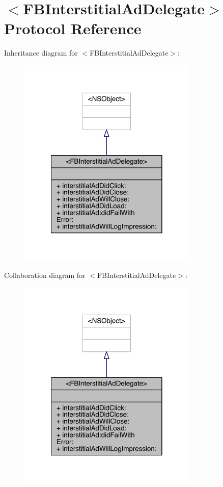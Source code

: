 \hypertarget{protocol_f_b_interstitial_ad_delegate-p}{\section{$<$F\-B\-Interstitial\-Ad\-Delegate$>$ Protocol Reference}
\label{protocol_f_b_interstitial_ad_delegate-p}
}


Inheritance diagram for $<$F\-B\-Interstitial\-Ad\-Delegate$>$\-:
\nopagebreak
\begin{figure}[H]
\begin{center}
\leavevmode
\includegraphics[width=242pt]{protocol_f_b_interstitial_ad_delegate-p__inherit__graph}
\end{center}
\end{figure}


Collaboration diagram for $<$F\-B\-Interstitial\-Ad\-Delegate$>$\-:
\nopagebreak
\begin{figure}[H]
\begin{center}
\leavevmode
\includegraphics[width=242pt]{protocol_f_b_interstitial_ad_delegate-p__coll__graph}
\end{center}
\end{figure}
